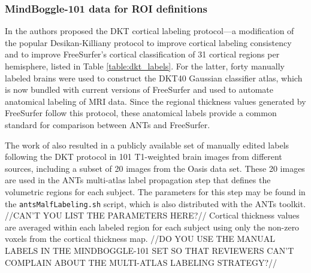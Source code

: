 \subsubsection{MindBoggle-101 data for ROI definitions}

In \cite{klein2012} the authors proposed the DKT cortical labeling protocol---a modification of the
popular Desikan-Killiany protocol \cite{desikan2006} to improve cortical labeling
consistency and to improve FreeSurfer's cortical classification of 31 cortical regions per hemisphere,
listed in Table \ref{table:dkt_labels}.
For the latter, forty manually labeled brains were used to construct the DKT40 Gaussian classifier atlas,
which is now bundled with current versions of FreeSurfer and
used to automate anatomical labeling of MRI data.
Since the regional thickness values generated by FreeSurfer follow this protocol,
these anatomical labels provide a common standard for comparison between ANTs and FreeSurfer.

The work of \cite{klein2012} also resulted in a publicly available set of
manually edited labels following the DKT protocol in 101
T1-weighted  brain images from different sources, including a subset of 20 images
from the Oasis data set.  These 20 images are used in the ANTs
multi-atlas label propagation \cite{wang2013} step that defines the volumetric regions for each subject.
The parameters for this step may be found in the {\tt antsMalfLabeling.sh} script, which is also
distributed with the ANTs toolkit.  //CAN'T YOU LIST THE PARAMETERS HERE?//
Cortical thickness values are averaged within each labeled region for each subject using only
the non-zero voxels from the cortical thickness map.
//DO YOU USE THE MANUAL LABELS IN THE MINDBOGGLE-101 SET SO THAT REVIEWERS CAN'T
COMPLAIN ABOUT THE MULTI-ATLAS LABELING STRATEGY?//

